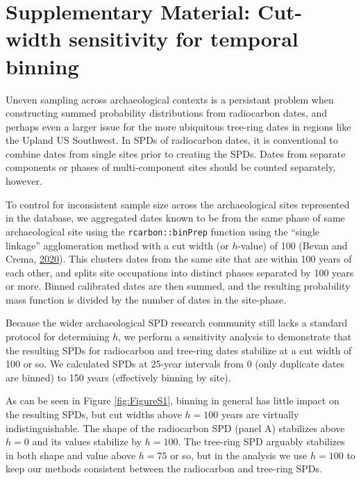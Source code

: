\documentclass[
]{sa}
\begin{document}
\hypertarget{supplementary-material-cut-width-sensitivity-for-temporal-binning}{%
\section*{Supplementary Material: Cut-width sensitivity for temporal binning}\label{supplementary-material-cut-width-sensitivity-for-temporal-binning}}

Uneven sampling across archaeological contexts is a persistant problem when constructing summed probability distributions from radiocarbon dates, and perhaps even a larger issue for the more ubiquitous tree-ring dates in regions like the Upland US Southwest. In SPDs of radiocarbon dates, it is conventional to combine dates from single sites prior to creating the SPDs. Dates from separate components or phases of multi-component sites should be counted separately, however.

To control for inconsistent sample size across the archaeological sites represented in the database, we aggregated dates known to be from the same phase of same archaeological site using the \texttt{rcarbon::binPrep} function using the ``single linkage'' agglomeration method with a cut width (or \(h\)-value) of 100 (Bevan and Crema, \protect\hyperlink{ref-rcarbon}{2020}). This clusters dates from the same site that are within 100 years of each other, and splits site occupations into distinct phases separated by 100 years or more. Binned calibrated dates are then summed, and the resulting probability mass function is divided by the number of dates in the site-phase.

Because the wider archaeological SPD research community still lacks a standard protocol for determining \(h\), we perform a sensitivity analysis to demonstrate that the resulting SPDs for radiocarbon and tree-ring dates stabilize at a cut width of 100 or so. We calculated SPDs at 25-year intervals from 0 (only duplicate dates are binned) to 150 years (effectively binning by site).

As can be seen in Figure \ref{fig:FigureS1}, binning in general has little impact on the resulting SPDs, but cut widths above \(h=100\) years are virtually indistinguishable. The shape of the radiocarbon SPD (panel A) stabilizes above \(h=0\) and its values stabilize by \(h=100\). The tree-ring SPD arguably stabilizes in both shape and value above \(h=75\) or so, but in the analysis we use \(h=100\) to keep our methods consistent between the radiocarbon and tree-ring SPDs.
\end{document}
